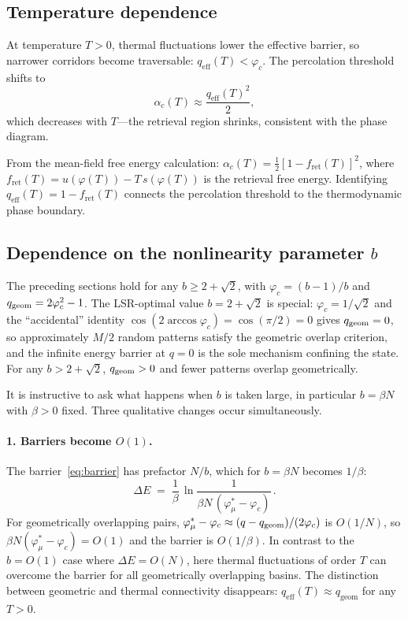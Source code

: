\documentclass[11pt]{article}
\newcommand{\vp}{\varphi}
\begin{document}
\subsection{Temperature dependence}

At temperature $T > 0$, thermal fluctuations lower the effective
barrier, so narrower corridors become traversable:
$q_\mathrm{eff}(T) < \vp_c$.  The percolation threshold
shifts to
\begin{equation}
  \alpha_c(T) \approx \frac{q_\mathrm{eff}(T)^2}{2},
\end{equation}
which decreases with $T$---the retrieval region shrinks,
consistent with the phase diagram.

From the mean-field free energy calculation:
$\alpha_c(T) = \tfrac{1}{2}[1 - f_\mathrm{ret}(T)]^2$,
where $f_\mathrm{ret}(T) = u(\vp(T)) - T\,s(\vp(T))$ is
the retrieval free energy.  Identifying
$q_\mathrm{eff}(T) = 1 - f_\mathrm{ret}(T)$ connects
the percolation threshold to the thermodynamic phase boundary.


\subsection{Dependence on the nonlinearity parameter $b$}
\label{sec:b_scaling}

The preceding sections hold for any $b \ge 2 + \sqrt{2}$,
with $\vp_c = (b{-}1)/b$ and
$q_{\rm geom} = 2\vp_c^2 - 1$.
The LSR-optimal value $b = 2 + \sqrt{2}$ is special:
$\vp_c = 1/\sqrt{2}$ and the ``accidental'' identity
$\cos(2\arccos\vp_c) = \cos(\pi/2) = 0$
gives $q_{\rm geom} = 0$, so approximately $M/2$
random patterns satisfy the geometric overlap criterion,
and the infinite energy barrier at $q = 0$ is the sole
mechanism confining the state.
For any $b > 2 + \sqrt{2}$, $q_{\rm geom} > 0$ and fewer
patterns overlap geometrically.

It is instructive to ask what happens when $b$ is taken large,
in particular $b = \beta N$ with $\beta > 0$ fixed.
Three qualitative changes occur simultaneously.

\paragraph{1. Barriers become $O(1)$.}
The barrier~\eqref{eq:barrier} has prefactor $N/b$,
which for $b = \beta N$ becomes $1/\beta$:
\begin{equation}\label{eq:barrier_bN}
  \Delta E \;=\; \frac{1}{\beta}\,
  \ln\frac{1}{\beta N\,(\vp_\mu^* - \vp_c)}\,.
\end{equation}
For geometrically overlapping pairs,
$\vp_\mu^* - \vp_c \approx (q - q_{\rm geom})/(2\vp_c)$
is $O(1/N)$, so $\beta N(\vp_\mu^* - \vp_c) = O(1)$
and the barrier is $O(1/\beta)$.
In contrast to the $b = O(1)$ case where $\Delta E = O(N)$,
here thermal fluctuations of order $T$ can overcome the barrier
for all geometrically overlapping basins.  The distinction between
geometric and thermal connectivity disappears:
$q_\mathrm{eff}(T) \approx q_\mathrm{geom}$ for any $T > 0$.
\end{document}
